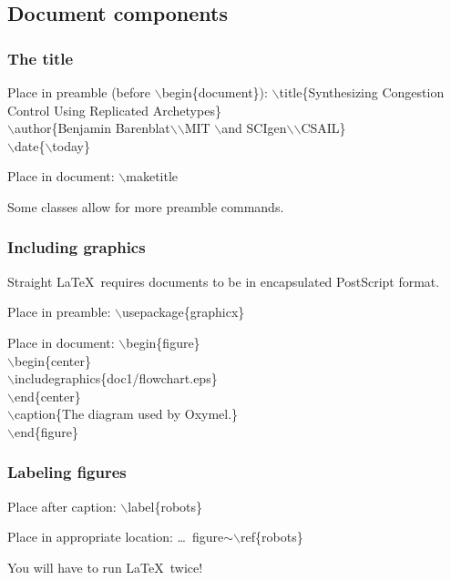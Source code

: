 \documentclass[ignorenonframetext]{beamer}
\begin{document}
\subsection{Document components}
\begin{frame}
  \frametitle{The title}
  \begin{block}{Place in preamble (before $\backslash$begin\{document\}):}
    $\backslash$title\{Synthesizing Congestion Control Using Replicated Archetypes\}\\
    $\backslash$author\{Benjamin Barenblat$\backslash$$\backslash$MIT $\backslash$and SCIgen$\backslash$$\backslash$CSAIL\}\\
    $\backslash$date\{$\backslash$today\}
  \end{block}
  \begin{block}{Place in document:}
    $\backslash$maketitle
  \end{block}
  Some classes allow for more preamble commands.
\end{frame}

\begin{frame}
  \frametitle{Including graphics}
  Straight \LaTeX\ requires documents to be in encapsulated PostScript format.
  \begin{block}{Place in preamble:}
    $\backslash$usepackage\{graphicx\}
  \end{block}
  \begin{block}{Place in document:}
    $\backslash$begin\{figure\}\\
    \quad$\backslash$begin\{center\}\\
    \qquad$\backslash$includegraphics\{doc1/flowchart.eps\}\\
    \quad$\backslash$end\{center\}\\
    \quad$\backslash$caption\{The diagram used by Oxymel.\}\\
    $\backslash$end\{figure\}
  \end{block}
\end{frame}

\begin{frame}
  \frametitle{Labeling figures}
  \begin{block}{Place after caption:}
    $\backslash$label\{robots\}
  \end{block}
  \begin{block}{Place in appropriate location:}
    \ldots\ figure$\sim$$\backslash$ref\{robots\}
  \end{block}
  You will have to run \LaTeX\ twice!
\end{frame}
\end{document}
